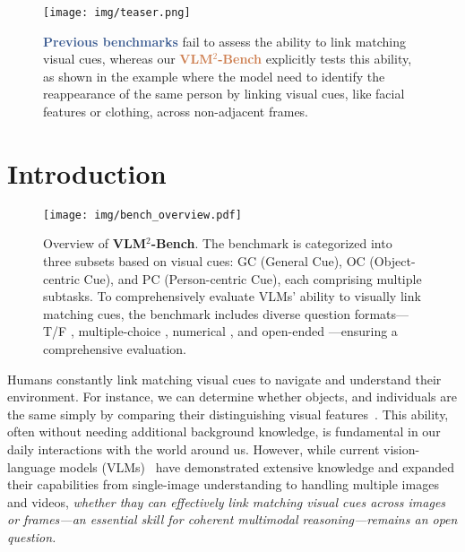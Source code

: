 \begin{figure}[t]
  \centering
  \texttt{[image: img/teaser.png]} 
  \caption{\textcolor[HTML]{3d5d92}{\textbf{Previous benchmarks}} fail to assess the ability to link matching visual cues, whereas our \textcolor[HTML]{cd7d4e}{\textbf{VLM$^2$-Bench}} explicitly tests this ability, as shown in the example where the model need to identify the reappearance of the same person by linking visual cues, like facial features or clothing, across non-adjacent frames. 
  }
  \label{fig:teaser}
  \vspace{-0.5em}
\end{figure}
\section{Introduction}
\begin{figure*}[t]
  \centering
  \texttt{[image: img/bench\_overview.pdf]} 
  \caption{Overview of \textbf{VLM$^2$-Bench}. The benchmark is categorized into three subsets based on visual cues: GC (General Cue), OC (Object-centric Cue), and PC (Person-centric Cue), each comprising multiple subtasks. To comprehensively evaluate VLMs' ability to visually link matching cues, the benchmark includes diverse question formats—T/F , multiple-choice , numerical , and open-ended —ensuring a comprehensive evaluation.}
  \label{fig:overview}
\end{figure*}
Humans constantly link matching visual cues to navigate and understand their environment. For instance, we can determine whether objects, and individuals are the same simply by comparing their distinguishing visual features~\citep{face1,face2,object1}. This ability, often without needing additional background knowledge, is fundamental in our daily interactions with the world around us. However, while current vision-language models (VLMs)~\citep{internvl,llava-onevision,llava-video,Qwen2.5-VL} have demonstrated extensive knowledge and expanded their capabilities from single-image understanding to handling multiple images and videos, \textit{whether thay can effectively link matching visual cues across images or frames—an essential skill for coherent multimodal reasoning—remains an open question.} 

